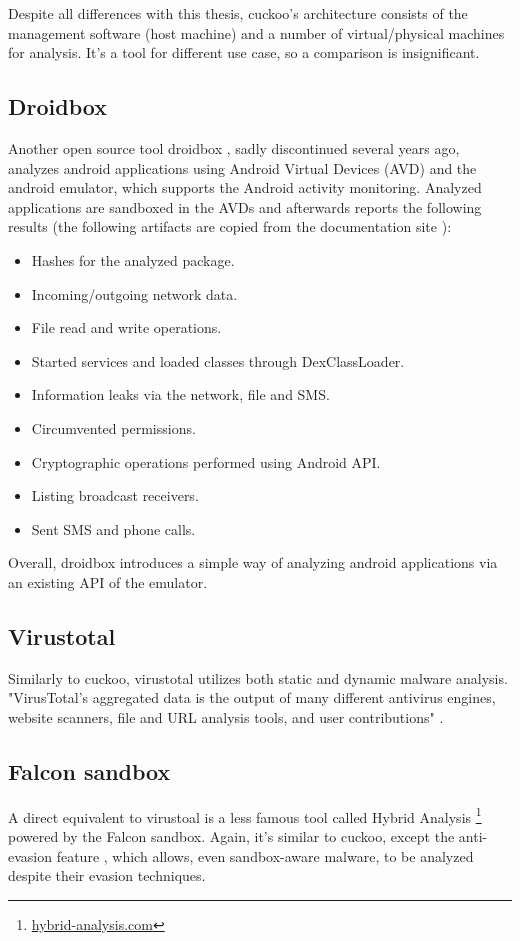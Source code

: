 Despite all differences with this thesis, cuckoo's architecture consists of the management software (host machine) and a number of virtual/physical machines for analysis. It's a tool for different use case, so a comparison is insignificant.

\subsection{Droidbox \label{related:malware-anal:droidbox}}
Another open source tool droidbox \cite{git:droidbox}, sadly discontinued several years ago, analyzes android applications using Android Virtual Devices (AVD) and the android emulator, which supports the Android activity monitoring. Analyzed applications are sandboxed in the AVDs and afterwards reports the following results (the following artifacts are copied from the documentation site \cite{git:droidbox}):

\begin{itemize}[noitemsep]
	\item Hashes for the analyzed package.
	\item Incoming/outgoing network data.
	\item File read and write operations.
	\item Started services and loaded classes through DexClassLoader.
	\item Information leaks via the network, file and SMS.
	\item Circumvented permissions.
	\item Cryptographic operations performed using Android API.
	\item Listing broadcast receivers.
	\item Sent SMS and phone calls.
\end{itemize}

Overall, droidbox introduces a simple way of analyzing android applications via an existing API of the emulator.

\subsection{Virustotal \label{related:malware-anal:virustotal}}
Similarly to cuckoo, virustotal utilizes both static and dynamic malware analysis. "VirusTotal's aggregated data is the output of many different antivirus engines, website scanners, file and URL analysis tools, and user contributions" \cite{docs:virustotal}. 

\subsection{Falcon sandbox \label{related:malware-anal:falcon}}
A direct equivalent to virustoal is a less famous tool called Hybrid Analysis \footnote{\url{hybrid-analysis.com}} powered by the Falcon sandbox. Again, it's similar to cuckoo, except the anti-evasion feature \cite{blog:detonation-techs}, which allows, even sandbox-aware malware, to be analyzed despite their evasion techniques.

